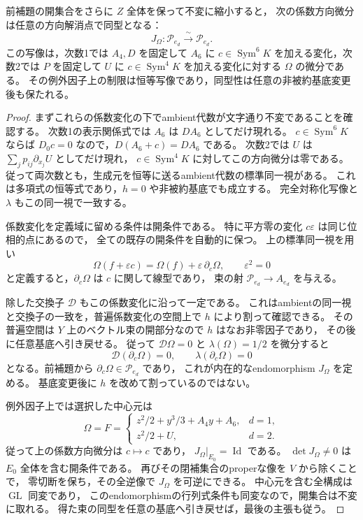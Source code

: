 \begin{proposition}[Casimir係数の可逆なJacobianを持つ零切断近傍]
\label{prop:casimir-jacobian-zero-neighborhood}
前補題の開集合をさらに $Z$ 全体を保って不変に縮小すると，
次の係数方向微分は任意の方向解消点で同型となる：
\[
          J_\Omega:\mathcal P_{e_d}\xrightarrow{\ \sim\ }\mathcal P_{e_d}.
\]
この写像は，次数1では $A_4,D$ を固定して $A_6$ に
$c\in\operatorname{Sym}^6K$ を加える変化，次数2では $P$ を固定して
$U$ に $c\in\operatorname{Sym}^4K$ を加える変化に対する $\Omega$ の微分である。
その例外因子上の制限は恒等写像であり，同型性は任意の非被約基底変更後も保たれる。
\end{proposition}
\begin{proof}
まずこれらの係数変化の下でambient代数が文字通り不変であることを確認する。
次数1の表示関係式では $A_6$ は $DA_6$ としてだけ現れる。
$c\in\operatorname{Sym}^6K$ ならば $D_0c=0$ なので，$D(A_6+c)=DA_6$ である。
次数2では $U$ は $\sum_jp_{ij}\partial_{x_j}U$ としてだけ現れ，
$c\in\operatorname{Sym}^4K$ に対してこの方向微分は零である。
従って両次数とも，生成元を恒等に送るambient代数の標準同一視がある。
これは多項式の恒等式であり，$h=0$ や非被約基底でも成立する。
完全対称化写像と $\lambda$ もこの同一視で一致する。

係数変化を定義域に留める条件は開条件である。
特に平方零の変化 $c\varepsilon$ は同じ位相的点にあるので，
全ての既存の開条件を自動的に保つ。
上の標準同一視を用い
\[
 \Omega(f+\varepsilon c)
       =\Omega(f)+\varepsilon\,\partial_c\Omega,
       \qquad\varepsilon^2=0
\]
と定義すると，$\partial_c\Omega$ は $c$ に関して線型であり，
束の射 $\mathcal P_{e_d}\to A_{e_d}$ を与える。

除した交換子 $\mathcal D$ もこの係数変化に沿って一定である。
これはambientの同一視と交換子の一致を，普遍係数変化の空間上で $h$ により割って確認できる。
その普遍空間は $Y$ 上のベクトル束の開部分なので $h$ はなお非零因子であり，
その後に任意基底へ引き戻せる。
従って $\mathcal D\Omega=0$ と $\lambda(\Omega)=1/2$ を微分すると
\[
       \mathcal D(\partial_c\Omega)=0,
       \qquad\lambda(\partial_c\Omega)=0
\]
となる。前補題から $\partial_c\Omega\in\mathcal P_{e_d}$ であり，
これが内在的なendomorphism $J_\Omega$ を定める。
基底変更後に $h$ を改めて割っているのではない。

例外因子上では選択した中心元は
\[
 \Omega=F=
 \begin{cases}
 z^2/2+y^3/3+A_4y+A_6,&d=1,\\
 z^2/2+U,&d=2.
 \end{cases}
\]
従って上の係数方向微分は $c\mapsto c$ であり，
$J_\Omega|_{E_0}=\operatorname{Id}$ である。
$\det J_\Omega\ne0$ は $E_0$ 全体を含む開条件である。
再びその閉補集合のproperな像を $V$ から除くことで，
零切断を保ち，その全逆像で $J_\Omega$ を可逆にできる。
中心元を含む全構成は $\operatorname{GL}$ 同変であり，
このendomorphismの行列式条件も同変なので，開集合は不変に取れる。
得た束の同型を任意の基底へ引き戻せば，最後の主張も従う。
\end{proof}


